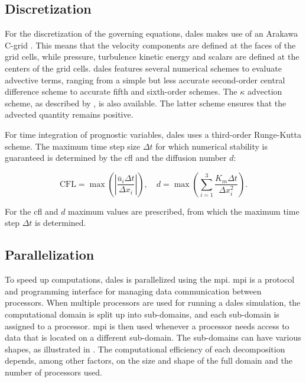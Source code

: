 \subsection{Discretization}
For the discretization of the governing equations, \acrshort{dales} makes use of an Arakawa C-grid \citep{arakawaComputationalDesignBasic1977}. This means that the velocity components are defined at the faces of the grid cells, while pressure, turbulence kinetic energy and scalars are defined at the centers of the grid cells. \acrshort{dales} features several numerical schemes to evaluate advective terms, ranging from a simple but less accurate second-order central difference scheme to accurate fifth and sixth-order schemes. The $\kappa$ advection scheme, as described by \citet{hundsdorferPositiveFiniteDifferenceAdvection1995}, is also available. The latter scheme ensures that the advected quantity remains positive.

For time integration of prognostic variables, \acrshort{dales} uses a third-order Runge-Kutta scheme. The maximum time step size $\Delta t$ for which numerical stability is guaranteed is determined by the \acrfull{cfl} and the diffusion number $d$:

\begin{equation}
    \text{CFL} = \max \left( \left| \frac{\overline{u}_i \Delta t}{\Delta x_i} \right| \right), \quad d = \max \left( \sum_{i=1}^{3} \frac{K_m \Delta t}{\Delta x_i^2} \right).
\end{equation}

For the \acrshort{cfl} and $d$ maximum values are prescribed, from which the maximum time step $\Delta t$ is determined.

\subsection{Parallelization} \label{sec:dales_mpi}
To speed up computations, \acrshort{dales} is parallelized using the \acrfull{mpi}. \acrshort{mpi} is a protocol and programming interface for managing data communication between processors. When multiple processors are used for running a \acrshort{dales} simulation, the computational domain is split up into sub-domains, and each sub-domain is assigned to a processor. \acrshort{mpi} is then used whenever a processor needs access to data that is located on a different sub-domain. The sub-domains can have various shapes, as illustrated in . The computational efficiency of each decomposition depends, among other factors, on the size and shape of the full domain and the number of processors used.


